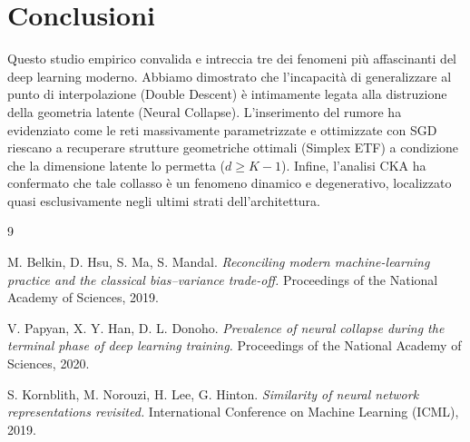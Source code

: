 \documentclass[10pt,twocolumn,letterpaper]{article}
\begin{document}
\section{Conclusioni}
Questo studio empirico convalida e intreccia tre dei fenomeni più affascinanti del deep learning moderno. Abbiamo dimostrato che l'incapacità di generalizzare al punto di interpolazione (Double Descent) è intimamente legata alla distruzione della geometria latente (Neural Collapse). L'inserimento del rumore ha evidenziato come le reti massivamente parametrizzate e ottimizzate con SGD riescano a recuperare strutture geometriche ottimali (Simplex ETF) a condizione che la dimensione latente lo permetta ($d \ge K-1$). Infine, l'analisi CKA ha confermato che tale collasso è un fenomeno dinamico e degenerativo, localizzato quasi esclusivamente negli ultimi strati dell'architettura.

\begin{thebibliography}{9}

M. Belkin, D. Hsu, S. Ma, S. Mandal.
\textit{Reconciling modern machine-learning practice and the classical bias–variance trade-off.}
Proceedings of the National Academy of Sciences, 2019.

V. Papyan, X. Y. Han, D. L. Donoho.
\textit{Prevalence of neural collapse during the terminal phase of deep learning training.}
Proceedings of the National Academy of Sciences, 2020.

S. Kornblith, M. Norouzi, H. Lee, G. Hinton.
\textit{Similarity of neural network representations revisited.}
International Conference on Machine Learning (ICML), 2019.

\end{thebibliography}
\end{document}
